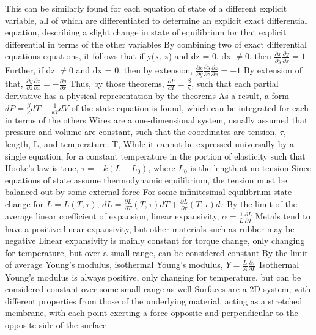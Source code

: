 \documentclass[11 pt, twoside]{article}
\newenvironment{outline*}
{
	\begin{outline}[enumerate]
	}
	{\end{outline}
}
\begin{document}
\begin{outline*}
\2 This can be similarly found for each equation of state of a different explicit variable, all of which are differentiated to determine an explicit exact differential equation, describing a slight change in state of equilibrium for that explicit differential in terms of the other variables
\3 By combining two of exact differential equations equations, it follows that if y(x, z) and dz = 0, dx $\neq 0$, then $\frac{\partial x}{\partial y}\frac{\partial y}{\partial x} = 1$
\4 Further, if dz $\neq 0$ and dx = 0, then by extension, $\frac{\partial x}{\partial y}\frac{\partial y}{\partial z}\frac{\partial z}{\partial x} = -1$
\4 By extension of that, $\frac{\partial y}{\partial z}\frac{\partial z}{\partial x} = -\frac{\partial y}{\partial x}$
\3 Thus, by those theorems, $\frac{\partial P}{\partial T} = \frac{\beta}{\kappa}$, such that each partial derivative has a physical representation by the theorems
\4 As a result, a form $dP = \frac{\beta}{\kappa}dT - \frac{1}{\kappa V}dV$ of the state equation is found, which can be integrated for each in terms of the others
\1 Wires are a one-dimensional system, usually assumed that pressure and volume are constant, such that the coordinates are tension, $\tau$, length, L, and temperature, T,
\2 While it cannot be expressed universally by a single equation, for a constant temperature in the portion of elasticity such that Hooke's law is true, $\tau = -k(L - L_0)$, where $L_0$ is the length at no tension
\3 Since equations of state assume thermodynamic equilibrium, the tension must be balanced out by some external force
\2 For some infinitesimal equilibrium state change for $L = L(T, \tau)$, $dL = \frac{\partial L}{\partial T}(T, \tau)dT + \frac{\partial L}{\partial \tau}(T, \tau)d\tau$
\3 By the limit of the average linear coefficient of expansion, linear expansivity, $\alpha = \frac{1}{L}\frac{\partial L}{\partial T}$
\4 Metals tend to have a positive linear expansivity, but other materials such as rubber may be negative
\4 Linear expansivity is mainly constant for torque change, only changing for temperature, but over a small range, can be considered constant
\3 By the limit of average Young's modulus, isothermal Young's modulus, $Y = \frac{L}{A}\frac{\partial \tau}{\partial L}$
\4 Isothermal Young's modulus is always positive, only changing for temperature, but can be considered constant over some small range as well
\1 Surfaces are a 2D system, with different properties from those of the underlying material, acting as a stretched membrane, with each point exerting a force opposite and perpendicular to the opposite side of the surface

\end{outline*}
\end{document}
